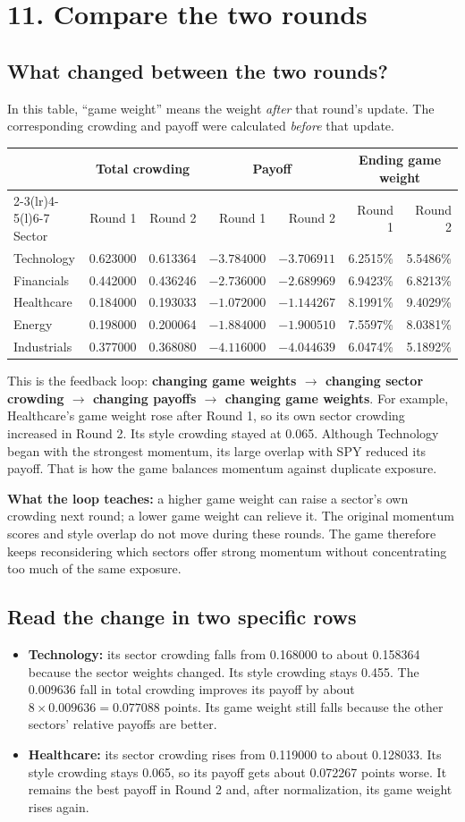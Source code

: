 \documentclass[11pt,letterpaper]{article}
\newcommand{\topic}[1]{\Needspace{5\baselineskip}\subsection*{#1}}
\newcommand{\guidepage}[1]{\clearpage\section*{#1}}
\begin{document}
\guidepage{11. Compare the two rounds}
\topic{What changed between the two rounds?}
In this table, ``game weight'' means the weight \emph{after} that round's update. The corresponding crowding and payoff were calculated \emph{before} that update.
\begin{center}
\small
\begin{tabular}{@{}lrrrrrr@{}}
\toprule
& \multicolumn{2}{c}{Total crowding} & \multicolumn{2}{c}{Payoff} & \multicolumn{2}{c}{Ending game weight}\\
\cmidrule(lr){2-3}\cmidrule(lr){4-5}\cmidrule(l){6-7}
Sector & Round 1 & Round 2 & Round 1 & Round 2 & Round 1 & Round 2\\
\midrule
Technology & 0.623000 & 0.613364 & $-3.784000$ & $-3.706911$ & 6.2515\% & 5.5486\%\\
Financials & 0.442000 & 0.436246 & $-2.736000$ & $-2.689969$ & 6.9423\% & 6.8213\%\\
Healthcare & 0.184000 & 0.193033 & $-1.072000$ & $-1.144267$ & 8.1991\% & 9.4029\%\\
Energy & 0.198000 & 0.200064 & $-1.884000$ & $-1.900510$ & 7.5597\% & 8.0381\%\\
Industrials & 0.377000 & 0.368080 & $-4.116000$ & $-4.044639$ & 6.0474\% & 5.1892\%\\
\bottomrule
\end{tabular}
\end{center}
This is the feedback loop: \textbf{changing game weights $\rightarrow$ changing sector crowding $\rightarrow$ changing payoffs $\rightarrow$ changing game weights}. For example, Healthcare's game weight rose after Round 1, so its own sector crowding increased in Round 2. Its style crowding stayed at 0.065. Although Technology began with the strongest momentum, its large overlap with SPY reduced its payoff. That is how the game balances momentum against duplicate exposure.

\textbf{What the loop teaches:} a higher game weight can raise a sector's own crowding next round; a lower game weight can relieve it. The original momentum scores and style overlap do not move during these rounds. The game therefore keeps reconsidering which sectors offer strong momentum without concentrating too much of the same exposure.

\topic{Read the change in two specific rows}
\begin{itemize}
\item \textbf{Technology:} its sector crowding falls from 0.168000 to about 0.158364 because the sector weights changed. Its style crowding stays 0.455. The 0.009636 fall in total crowding improves its payoff by about $8\times0.009636=0.077088$ points. Its game weight still falls because the other sectors' relative payoffs are better.
\item \textbf{Healthcare:} its sector crowding rises from 0.119000 to about 0.128033. Its style crowding stays 0.065, so its payoff gets about 0.072267 points worse. It remains the best payoff in Round 2 and, after normalization, its game weight rises again.
\end{itemize}
\end{document}
